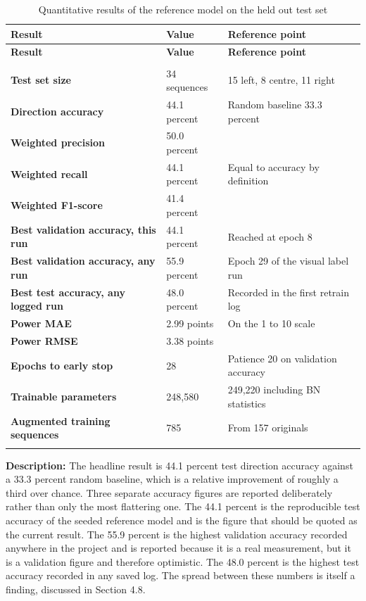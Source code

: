 \renewcommand{\arraystretch}{1.3}
\small
\begin{longtable}{|>{\bfseries}p{6.0cm}|p{3.4cm}|p{4.0cm}|}
\hline
\textbf{Result} & \textbf{Value} & \textbf{Reference point} \\ \hline
\endfirsthead
\hline
\textbf{Result} & \textbf{Value} & \textbf{Reference point} \\ \hline
\endhead
\hline
\multicolumn{3}{r}{\textit{Continued on next page}} \\
\hline
\endfoot
\hline
\endlastfoot
Test set size & 34 sequences & 15 left, 8 centre, 11 right \\ \hline
Direction accuracy & 44.1 percent & Random baseline 33.3 percent \\ \hline
Weighted precision & 50.0 percent & \\ \hline
Weighted recall & 44.1 percent & Equal to accuracy by definition \\ \hline
Weighted F1-score & 41.4 percent & \\ \hline
Best validation accuracy, this run & 44.1 percent & Reached at epoch 8 \\ \hline
Best validation accuracy, any run & 55.9 percent & Epoch 29 of the visual label run \\ \hline
Best test accuracy, any logged run & 48.0 percent & Recorded in the first retrain log \\ \hline
Power MAE & 2.99 points & On the 1 to 10 scale \\ \hline
Power RMSE & 3.38 points & \\ \hline
Epochs to early stop & 28 & Patience 20 on validation accuracy \\ \hline
Trainable parameters & 248,580 & 249,220 including BN statistics \\ \hline
Augmented training sequences & 785 & From 157 originals \\ \hline
\caption{Quantitative results of the reference model on the held out test set}
\label{tab:test-results}
\end{longtable}
\normalsize

\noindent
\textbf{Description:} The headline result is 44.1 percent test direction accuracy against a 33.3 percent random baseline, which is a relative improvement of roughly a third over chance. Three separate accuracy figures are reported deliberately rather than only the most flattering one. The 44.1 percent is the reproducible test accuracy of the seeded reference model and is the figure that should be quoted as the current result. The 55.9 percent is the highest validation accuracy recorded anywhere in the project and is reported because it is a real measurement, but it is a validation figure and therefore optimistic. The 48.0 percent is the highest test accuracy recorded in any saved log. The spread between these numbers is itself a finding, discussed in Section 4.8.

